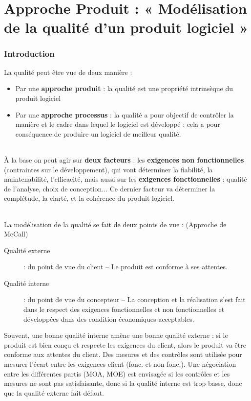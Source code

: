 \part{Approche Produit : « Modélisation de la qualité d’un produit logiciel »}

\section{Introduction}

La qualité peut être vue de deux manière :
\begin{itemize}
\item Par une \textbf{approche produit} : la qualité est une propriété intrinsèque du produit logiciel
\item Par une \textbf{approche processus} : la qualité a pour objectif de contrôler la manière et le cadre 	dans lequel le logiciel est développé : cela a pour conséquence de produire un logiciel de meilleur qualité.
\end{itemize}

\hfill\\

À la base on peut agir sur \textbf{deux facteurs} : les \textbf{exigences non fonctionnelles} (contraintes sur le développement), qui vont déterminer la fiabilité, la maintenabilité, l'efficacité, mais aussi sur les \textbf{exigences fonctionnelles} : qualité de l'analyse, choix de conception... Ce dernier facteur va déterminer la complétude, la clarté, et la cohérence du produit logiciel.

\hfill\\

La modélisation de la qualité se fait de deux points de vue : (Approche de McCall)
\begin{description}
\item[Qualité externe] : du point de vue du client – Le produit est conforme à ses attentes.
\item[Qualité interne] : du point  de vue du concepteur – La conception et la réalisation s'est fait dans le respect des exigences fonctionnelles et non fonctionnelles et développées dans des condition économiques acceptables.
\end{description}

Souvent, une bonne qualité interne amène une bonne qualité externe : si le produit est bien conçu et respecte les exigences du client, alors le produit va être conforme aux attentes du client. Des mesures et des contrôles sont utilisée pour mesurer l'écart entre les exigences client (fonc. et non fonc.). Une négociation entre les différentes partis (MOA, MOE) est envisagée si les contrôles et les mesures ne sont pas satisfaisante, donc si la qualité interne est trop basse, donc que la qualité externe fait défaut.

